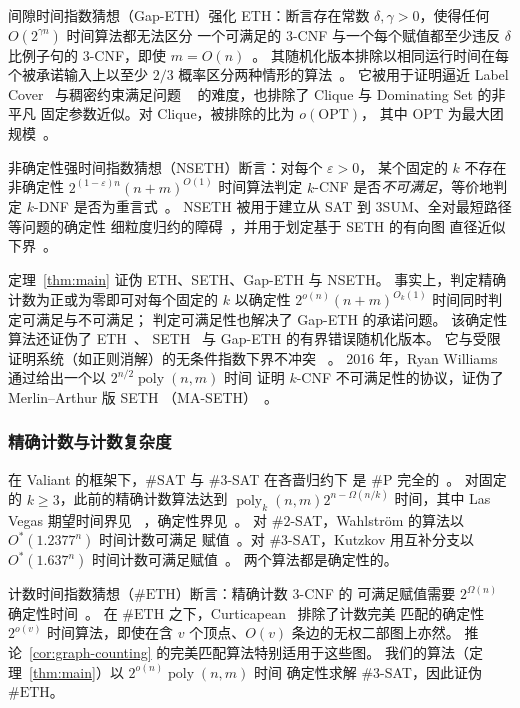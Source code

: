 \documentclass[11pt,reqno]{amsart}
\numberwithin{equation}{section}
\theoremstyle{definition}\newtheorem{definition}[theorem]{定义}
\theoremstyle{remark}\newtheorem{remark}[theorem]{注}
\newcommand{\poly}{\operatorname{poly}}
\renewcommand{\ge}{\geqslant}
\begin{document}
间隙时间指数猜想（Gap-ETH）强化 ETH：断言存在常数
$\delta,\gamma>0$，使得任何 $O(2^{\gamma n})$ 时间算法都无法区分
一个可满足的 $3$-CNF 与一个每个赋值都至少违反 $\delta$
比例子句的 $3$-CNF，即使 $m=O(n)$~\cite{Din16,MR17}。
其随机化版本排除以相同运行时间在每个被承诺输入上以至少 $2/3$
概率区分两种情形的算法~\cite[Conjecture~2.5]{CCK20}。
它被用于证明逼近 Label Cover~\cite{Din16} 与稠密约束满足问题
~\cite{MR17} 的难度，也排除了 Clique 与 Dominating Set 的非平凡
固定参数近似。对 Clique，被排除的比为 $o(\mathrm{OPT})$，
其中 $\mathrm{OPT}$ 为最大团规模~\cite[Corollaries~5.3 and~5.6]{CCK20}。

非确定性强时间指数猜想（NSETH）断言：对每个 $\varepsilon>0$，
某个固定的 $k$ 不存在非确定性 $2^{(1-\varepsilon)n}(n+m)^{O(1)}$
时间算法判定 $k$-CNF 是否\emph{不可满足}，等价地判定 $k$-DNF
是否为重言式~\cite{CGIMPS16}。
NSETH 被用于建立从 SAT 到 3SUM、全对最短路径等问题的确定性
细粒度归约的障碍~\cite{CGIMPS16}，并用于划定基于 SETH 的有向图
直径近似下界~\cite{Li21}。

定理~\ref{thm:main} 证伪 ETH、SETH、Gap-ETH 与 NSETH。
事实上，判定精确计数为正或为零即可对每个固定的 $k$ 以确定性
$2^{o(n)}(n+m)^{O_k(1)}$ 时间同时判定可满足与不可满足；
判定可满足性也解决了 Gap-ETH 的承诺问题。
该确定性算法还证伪了 ETH~\cite[Section~1]{DHMTW}、
SETH~\cite[Definition~2.1]{CDL16} 与 Gap-ETH 的有界错误随机化版本。
它与受限证明系统（如正则消解）的无条件指数下界不冲突
~\cite{BeckImp13}。
2016 年，Ryan Williams 通过给出一个以 $2^{n/2}\poly(n,m)$ 时间
证明 $k$-CNF 不可满足性的协议，证伪了 Merlin--Arthur 版 SETH
（MA-SETH）~\cite[Theorem~3.3]{Wil16}。

\subsubsection{精确计数与计数复杂度}\label{subsec:related-counting}
在 Valiant 的框架下，$\#\mathrm{SAT}$ 与 $\#3$-SAT 在吝啬归约下
是 $\#\mathrm P$ 完全的~\cite[Section~3, Facts~1--2]{Val79}。
对固定的 $k\ge3$，此前的精确计数算法达到
$\poly_k(n,m)2^{n-\Omega(n/k)}$ 时间，其中 Las Vegas 期望时间界见
~\cite[Lemma~3.5]{IMP12}，确定性界见~\cite[Theorem~1.6]{CW21}。
对 $\#2$-SAT，Wahlstr\"om 的算法以 $O^*(1.2377^n)$ 时间计数可满足
赋值~\cite{Wahlstrom08}。对 $\#3$-SAT，Kutzkov 用互补分支以
$O^*(1.637^n)$ 时间计数可满足赋值~\cite{Kutzkov26}。
两个算法都是确定性的。

计数时间指数猜想（$\#\mathrm{ETH}$）断言：精确计数 $3$-CNF 的
可满足赋值需要 $2^{\Omega(n)}$ 确定性时间~\cite[Section~1]{DHMTW}。
在 $\#\mathrm{ETH}$ 之下，Curticapean~\cite{Cur18} 排除了计数完美
匹配的确定性 $2^{o(v)}$ 时间算法，即使在含 $v$ 个顶点、$O(v)$
条边的无权二部图上亦然。
推论~\ref{cor:graph-counting} 的完美匹配算法特别适用于这些图。
我们的算法（定理~\ref{thm:main}）以 $2^{o(n)}\poly(n,m)$ 时间
确定性求解 $\#3$-SAT，因此证伪 $\#\mathrm{ETH}$。
\end{document}
